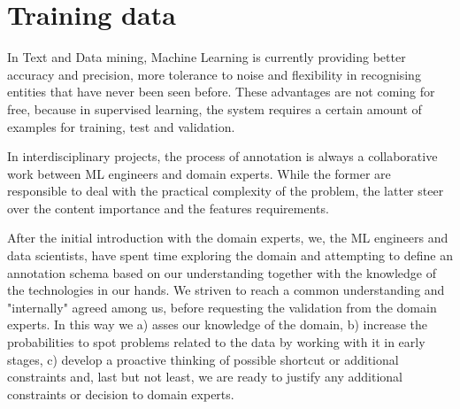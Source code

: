 \documentclass{article}
\begin{document}
\section{Training data}
\label{sec:training-data}

In Text and Data mining, Machine Learning is currently providing better accuracy and precision, more tolerance to noise and flexibility in recognising entities that have never been seen before. These advantages are not coming for free, because in supervised learning, the system requires a certain amount of examples for training, test and validation. 


In interdisciplinary projects, the process of annotation is always a collaborative work between ML engineers and domain experts. While the former are responsible to deal with the practical complexity of the problem, the latter steer over the content importance and the features requirements. 

After the initial introduction with the domain experts, we, the ML engineers and data scientists, have spent time exploring the domain and attempting to define an annotation schema based on our understanding together with the knowledge of the technologies in our hands. We striven to reach a common understanding and "internally" agreed among us, before requesting the validation from the domain experts. 
In this way we a) asses our knowledge of the domain, b) increase the probabilities to spot problems related to the data by working with it in early stages, c) develop a proactive thinking of possible shortcut or additional constraints and, last but not least, we are ready to justify any additional constraints or decision to domain experts. 
\end{document}
